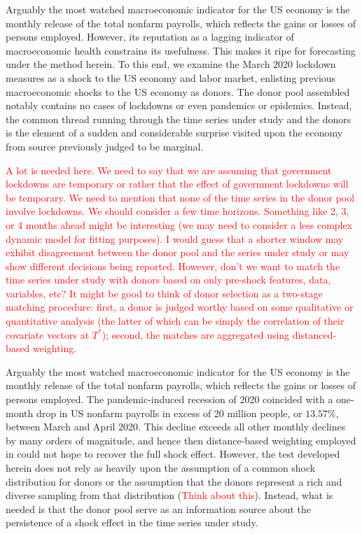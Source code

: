 \documentclass[11pt]{article}
\theoremstyle{definition}
\begin{document}
Arguably the most watched macroeconomic indicator for the US economy is the monthly release of the total nonfarm payrolls, which reflects the gains or losses of persons employed.  However, its reputation as a lagging indicator of macroeconomic health constrains its usefulness.  This makes it ripe for forecasting under the method herein.  To this end, we examine the March 2020 lockdown measures as a shock to the US economy and labor market, enlisting previous macroeconomic shocks to the US economy as donors.  The donor pool assembled notably contains no cases of lockdowns or even pandemics or epidemics.  Instead, the common thread running through the time series under study and the donors is the element of a sudden and considerable surprise visited upon the economy from source previously judged to be marginal.

\textcolor{red}{A lot is needed here. We need to say that we are assuming that government lockdowns are temporary or rather that the effect of government lockdowns will be temporary. We need to mention that none of the time series in the donor pool involve lockdowns. We should consider a few time horizons. Something like 2, 3, or 4 months ahead might be interesting (we may need to consider a less complex dynamic model for fitting purposes). I would guess that a shorter window may exhibit disagreement between the donor pool and the series under study or may show different decisions being reported. However, don't we want to match the time series under study with donors based on only pre-shock features, data, variables, etc?  It might be good to think of donor selection as a two-stage matching procedure: first, a donor is judged worthy based on some qualitative or quantitative analysis (the latter of which can be simply the correlation of their covariate vectors at $T^{*}$); second, the matches are aggregated using distanced-based weighting.}


Arguably the most watched macroeconomic indicator for the US economy is the monthly release of the total nonfarm payrolls, which reflects the gains or losses of persons employed. The pandemic-induced recession of 2020 coincided with a one-month drop in US nonfarm payrolls in excess of 20 million people, or $13.57\%$, between March and April 2020.  This decline exceeds all other monthly declines by many orders of magnitude, and hence then distance-based weighting employed in \citep{lin2021minimizing} could not hope to recover the full shock effect.  However, the test developed herein does not rely as heavily upon the assumption of a common shock distribution for donors or the assumption that the donors represent a rich and diverse sampling from that distribution (\textcolor{red}{Think about this}).  Instead, what is needed is that the donor pool serve as an information source about the persistence of a shock effect in the time series under study.  
\end{document}
